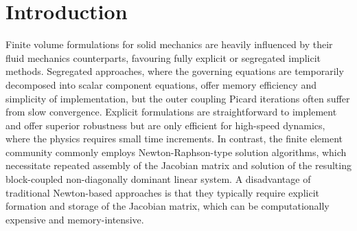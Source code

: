 \documentclass[sn-mathphys,Numbered]{sn-jnl}%
\begin{document}

\maketitle


\section{Introduction}\label{sec:intro}
%
Finite volume formulations for solid mechanics are heavily influenced by their fluid mechanics counterparts, favouring fully explicit \citep{Trangenstein1991, Kluth2010, Lee2013, Haider2017} or segregated implicit \citep{Demirdzic1988, Fryer1991, Demirdzic1995, Jasak2000, Tukovic2013, Cardiff2017, Tukovic2018, Batistic2022} methods.
Segregated approaches, where the governing equations are temporarily decomposed into scalar component equations, offer memory efficiency and simplicity of implementation, but the outer coupling Picard iterations often suffer from slow convergence.
Explicit formulations are straightforward to implement and offer superior robustness but are only efficient for high-speed dynamics, where the physics requires small time increments.
In contrast, the finite element community commonly employs Newton-Raphson-type solution algorithms, which necessitate repeated assembly of the Jacobian matrix and solution of the resulting block-coupled non-diagonally dominant linear system.
A disadvantage of traditional Newton-based approaches is that they typically require explicit formation and storage of the Jacobian matrix, which can be computationally expensive and memory-intensive.
\end{document}
